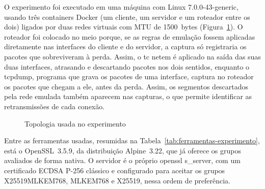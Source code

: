 \documentclass[12pt,a4paper]{article}
\newcommand{\fonte}[1]{\par\vspace{4pt}{\small Fonte: #1}}
\begin{document}
O experimento foi executado em uma máquina com Linux 7.0.0-43-generic, usando três containers Docker (um cliente, um
servidor e um roteador entre os dois) ligados por duas redes virtuais com MTU de 1500~bytes (Figura~\ref{fig:topologia-experimento}). O roteador foi colocado no meio porque, se as regras de emulação fossem
aplicadas diretamente nas interfaces do cliente e do servidor, a captura só
registraria os pacotes que sobreviveram à perda. Assim, o tc netem é
aplicado na saída das suas duas interfaces, atrasando e
descartando pacotes nos dois sentidos, enquanto o tcpdump, programa que
grava os pacotes de uma interface, captura no roteador os pacotes que
chegam a ele, antes da perda. Assim, os segmentos descartados pela rede emulada
também aparecem nas capturas, o que permite identificar as retransmissões
de cada conexão.

\begin{figure}[H]
\centering
\caption{Topologia usada no experimento}
\label{fig:topologia-experimento}
\fonte{Elaborado pelos autores.}
\end{figure}

Entre as ferramentas usadas, resumidas na
Tabela~\ref{tab:ferramentas-experimento}, está o OpenSSL~3.5.9, da
distribuição Alpine~3.22, que já oferece os grupos avaliados de forma
nativa. O servidor é o próprio
openssl s\_server, com um certificado ECDSA P-256 clássico e configurado
para aceitar os grupos X25519MLKEM768, MLKEM768 e X25519, nessa ordem de
preferência.
\end{document}
